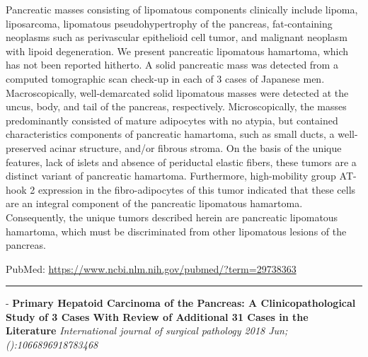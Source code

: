\documentclass[]{article}
\begin{document}
Pancreatic masses consisting of lipomatous components clinically include
lipoma, liposarcoma, lipomatous pseudohypertrophy of the pancreas,
fat-containing neoplasms such as perivascular epithelioid cell tumor,
and malignant neoplasm with lipoid degeneration. We present pancreatic
lipomatous hamartoma, which has not been reported hitherto. A solid
pancreatic mass was detected from a computed tomographic scan check-up
in each of 3 cases of Japanese men. Macroscopically, well-demarcated
solid lipomatous masses were detected at the uncus, body, and tail of
the pancreas, respectively. Microscopically, the masses predominantly
consisted of mature adipocytes with no atypia, but contained
characteristics components of pancreatic hamartoma, such as small ducts,
a well-preserved acinar structure, and/or fibrous stroma. On the basis
of the unique features, lack of islets and absence of periductal elastic
fibers, these tumors are a distinct variant of pancreatic hamartoma.
Furthermore, high-mobility group AT-hook 2 expression in the
fibro-adipocytes of this tumor indicated that these cells are an
integral component of the pancreatic lipomatous hamartoma. Consequently,
the unique tumors described herein are pancreatic lipomatous hamartoma,
which must be discriminated from other lipomatous lesions of the
pancreas.

PubMed: \url{https://www.ncbi.nlm.nih.gov/pubmed/?term=29738363}

{}

{}

\begin{center}\rule{0.5\linewidth}{\linethickness}\end{center}

 - \textbf{Primary Hepatoid Carcinoma of the Pancreas: A
Clinicopathological Study of 3 Cases With Review of Additional 31 Cases
in the Literature} \emph{International journal of surgical pathology
2018 Jun;():1066896918783468}
\end{document}
